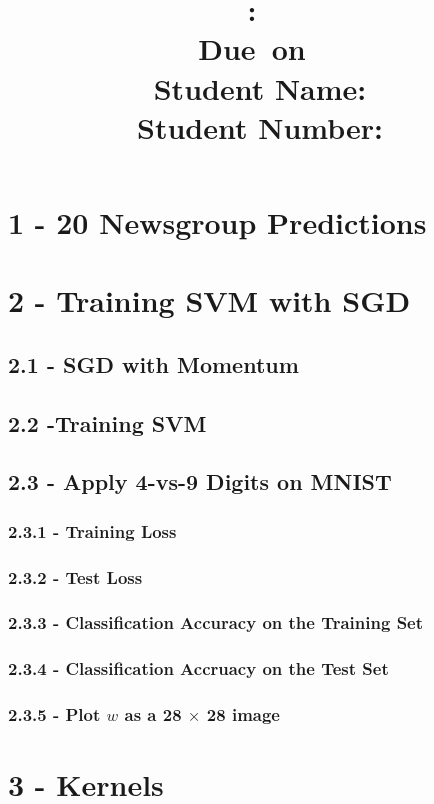 \documentclass[10pt]{article}
\title{
    \vspace{2in}
    \textmd{\textbf{\hmwkClass:\ \hmwkTitle}}\\
    \vspace{0.1in}\small{Due\ on\ \hmwkDueDate}\\
    \vspace{3in}
    \vspace{0.1in}\large{Student Name: \textbf{\hmwkAuthorName} } \\
    \vspace{0.1in}\large{Student Number: \textbf{\hmwkAuthorNumber} } \\
}
\date{}
\begin{document}
\maketitle
\pagebreak

\begin{center} \tableofcontents \end{center}
\pagebreak

\clearpage
\setcounter{page}{1}

\section{1 - 20 Newsgroup Predictions}
\section{2 - Training SVM with SGD}
\subsection{2.1 - SGD with Momentum}
\subsection{2.2 -Training SVM}
\subsection{2.3 - Apply 4-vs-9 Digits on MNIST}
\subsubsection{2.3.1 - Training Loss}
\subsubsection{2.3.2 - Test Loss}
\subsubsection{2.3.3 - Classification Accuracy on the Training Set}
\subsubsection{2.3.4 - Classification Accruacy on the Test Set}
\subsubsection{2.3.5 - Plot \textbf{$w$} as a 28 $\times $ 28 image }


\section{3 - Kernels}
\end{document}
